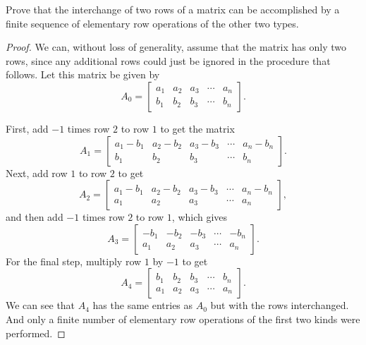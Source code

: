  Prove that the interchange of two rows of a matrix can be
accomplished by a finite sequence of elementary row operations of the
other two types.
\begin{proof}
  We can, without loss of generality, assume that the matrix has only
  two rows, since any additional rows could just be ignored in the
  procedure that follows. Let this matrix be given by
  \begin{equation*}
    A_0 =
    \begin{bmatrix}
      a_1 & a_2 & a_3 & \cdots & a_n \\
      b_1 & b_2 & b_3 & \cdots & b_n
    \end{bmatrix}.
  \end{equation*}

  First, add $-1$ times row $2$ to row $1$ to get the matrix
  \begin{equation*}
    A_1 =
    \begin{bmatrix}
      a_1 - b_1 & a_2 - b_2 & a_3 - b_3 & \cdots & a_n - b_n \\
      b_1 & b_2 & b_3 & \cdots & b_n
    \end{bmatrix}.
  \end{equation*}
  Next, add row $1$ to row $2$ to get
  \begin{equation*}
    A_2 =
    \begin{bmatrix}
      a_1 - b_1 & a_2 - b_2 & a_3 - b_3 & \cdots & a_n - b_n \\
      a_1 & a_2 & a_3 & \cdots & a_n
    \end{bmatrix},
  \end{equation*}
  and then add $-1$ times row $2$ to row $1$, which gives
  \begin{equation*}
    A_3 =
    \begin{bmatrix}
      -b_1 & -b_2 & -b_3 & \cdots & -b_n \\
      a_1 & a_2 & a_3 & \cdots & a_n
    \end{bmatrix}.
  \end{equation*}
  For the final step, multiply row $1$ by $-1$ to get
  \begin{equation*}
    A_4 =
    \begin{bmatrix}
      b_1 & b_2 & b_3 & \cdots & b_n \\
      a_1 & a_2 & a_3 & \cdots & a_n
    \end{bmatrix}.
  \end{equation*}
  We can see that $A_4$ has the same entries as $A_0$ but with the
  rows interchanged. And only a finite number of elementary row
  operations of the first two kinds were performed.
\end{proof}
